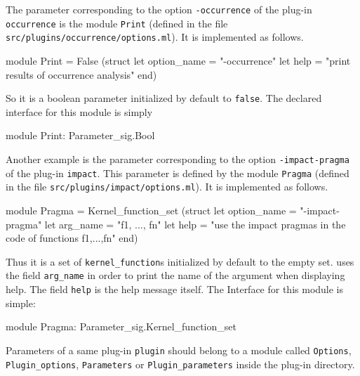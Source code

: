 \begin{example}
  The parameter corresponding to the option \texttt{-occurrence} of the plug-in
  \texttt{occurrence} is the module \texttt{Print} (defined in the file
  \texttt{src/plugins/occurrence/options.ml}). It is implemented as follows.
\begin{ocamlcode}
module Print =
  False
    (struct
       let option_name = "-occurrence"
       let help = "print results of occurrence analysis"
     end)
\end{ocamlcode}
So it is a boolean parameter initialized by default to
\texttt{false}. The declared interface for this module is simply
\begin{ocamlcode}
module Print: Parameter_sig.Bool
\end{ocamlcode}

Another example is the parameter corresponding to the option
\texttt{-impact-pragma} of the plug-in \texttt{impact}. This parameter is
defined by the module \texttt{Pragma} (defined in the file
\texttt{src/plugins/impact/options.ml}). It is implemented as follows.
\begin{ocamlcode}
module Pragma =
  Kernel_function_set
    (struct
       let option_name = "-impact-pragma"
       let arg_name = "f1, ..., fn"
       let help = "use the impact pragmas in the code of functions f1,...,fn"
     end)
\end{ocamlcode}
Thus it is a set of \texttt{kernel\_function}s initialized by default to
the empty set. \framac uses
the field \texttt{arg\_name} in order to print the name of the argument when
displaying help. The field \texttt{help} is the help message itself. The
Interface for this module is simple: 
\begin{ocamlcode}
module Pragma: Parameter_sig.Kernel_function_set
\end{ocamlcode}
\end{example}

\begin{convention}
Parameters of a same plug-in \texttt{plugin} should belong to a module called
\texttt{Options}, \texttt{Plugin\_options}, \texttt{Parameters} or
\texttt{Plugin\_parameters} inside the plug-in directory.
\end{convention}

